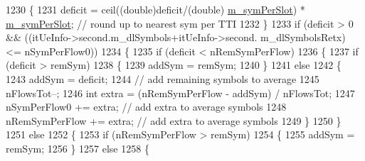\begin{DoxyCode}
1230                                 \{
1231                                         deficit = ceil((\textcolor{keywordtype}{double})deficit/(\textcolor{keywordtype}{double})
      \hyperlink{classns3_1_1MmWaveFlexTtiMacScheduler_aa911d95e2956fcccca151a7353b8d42f}{m\_symPerSlot}) * \hyperlink{classns3_1_1MmWaveFlexTtiMacScheduler_aa911d95e2956fcccca151a7353b8d42f}{m\_symPerSlot}; \textcolor{comment}{// round up to nearest sym per TTI}
1232                                 \}
1233                                 \textcolor{keywordflow}{if} (deficit > 0 && ((itUeInfo->second.m\_dlSymbols+itUeInfo->second.
      m\_dlSymbolsRetx) <= nSymPerFlow0))
1234                                 \{
1235                                         \textcolor{keywordflow}{if} (deficit < nRemSymPerFlow)
1236                                         \{
1237                                                 \textcolor{keywordflow}{if} (deficit > remSym)
1238                                                 \{
1239                                                         addSym = remSym;
1240                                                 \}
1241                                                 \textcolor{keywordflow}{else}
1242                                                 \{
1243                                                         addSym = deficit;
1244                                                         \textcolor{comment}{// add remaining symbols to average}
1245                                                         nFlowsTot--;
1246                                                         \textcolor{keywordtype}{int} extra = (nRemSymPerFlow - addSym) / nFlowsTot;
1247                                                         nSymPerFlow0 += extra;  \textcolor{comment}{// add extra to average
       symbols}
1248                                                         nRemSymPerFlow += extra;  \textcolor{comment}{// add extra to average
       symbols}
1249                                                 \}
1250                                         \}
1251                                         \textcolor{keywordflow}{else}
1252                                         \{
1253                                                 \textcolor{keywordflow}{if} (nRemSymPerFlow > remSym)
1254                                                 \{
1255                                                         addSym = remSym;
1256                                                 \}
1257                                                 \textcolor{keywordflow}{else}
1258                                                 \{

\end{DoxyCode}

